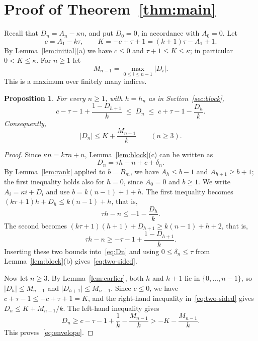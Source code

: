 \documentclass{amsart}
\newtheorem{proposition}[theorem]{Proposition}
\theoremstyle{definition}
\theoremstyle{remark}
\numberwithin{equation}{section}
\numberwithin{table}{section}
\begin{document}
\section{Proof of Theorem~\ref{thm:main}}\label{sec:proof}

Recall that $D_n=A_n-\kappa n$, and put $D_0=0$, in accordance with $A_0=0$. Let
\[
c=A_1-k\tau,\qquad K=-c+\tau+1=(k+1)\tau-A_1+1.
\]
By Lemma~\ref{lem:initial}(a) we have $c\le0$ and $\tau+1\le K\le\kappa$; in particular $0<K\le\kappa$. For $n\ge1$ let
\[
M_{n-1}=\max_{0\le i\le n-1}\lvert D_i\rvert.
\]
This is a maximum over finitely many indices.

\begin{proposition}\label{prop:envelope}
For every $n\ge1$, with $h=h_n$ as in Section~\ref{sec:block},
\begin{equation}\label{eq:two-sided}
c-\tau-1+\frac{1-D_{h+1}}{k}\;\le\;D_n\;\le\;c+\tau-1-\frac{D_h}{k}.
\end{equation}
Consequently,
\begin{equation}\label{eq:envelope}
\lvert D_n\rvert\le K+\frac{M_{n-1}}{k}\qquad(n\ge3).
\end{equation}
\end{proposition}

\begin{proof}
Since $\kappa n=k\tau n+n$, Lemma~\ref{lem:block}(c) can be written as
\begin{equation}\label{eq:Dn}
D_n=\tau h-n+c+\delta_n.
\end{equation}
By Lemma~\ref{lem:rank} applied to $b=B_m$, we have $A_h\le b-1$ and $A_{h+1}\ge b+1$; the first inequality holds also for $h=0$, since $A_0=0$ and $b\ge1$. We write $A_i=\kappa i+D_i$ and use $b=k(n-1)+1+h$. The first inequality becomes $(k\tau+1)h+D_h\le k(n-1)+h$, that is,
\[
\tau h-n\le-1-\frac{D_h}{k}.
\]
The second becomes $(k\tau+1)(h+1)+D_{h+1}\ge k(n-1)+h+2$, that is,
\[
\tau h-n\ge-\tau-1+\frac{1-D_{h+1}}{k}.
\]
Inserting these two bounds into~\eqref{eq:Dn} and using $0\le\delta_n\le\tau$ from Lemma~\ref{lem:block}(b) gives~\eqref{eq:two-sided}.

Now let $n\ge3$. By Lemma~\ref{lem:earlier}, both $h$ and $h+1$ lie in $\{0,\dots,n-1\}$, so $\lvert D_h\rvert\le M_{n-1}$ and $\lvert D_{h+1}\rvert\le M_{n-1}$. Since $c\le0$, we have $c+\tau-1\le-c+\tau+1=K$, and the right-hand inequality in~\eqref{eq:two-sided} gives $D_n\le K+M_{n-1}/k$. The left-hand inequality gives
\[
D_n\ge c-\tau-1+\frac1k-\frac{M_{n-1}}{k}>-K-\frac{M_{n-1}}{k}.
\]
This proves~\eqref{eq:envelope}.
\end{proof}
\end{document}
